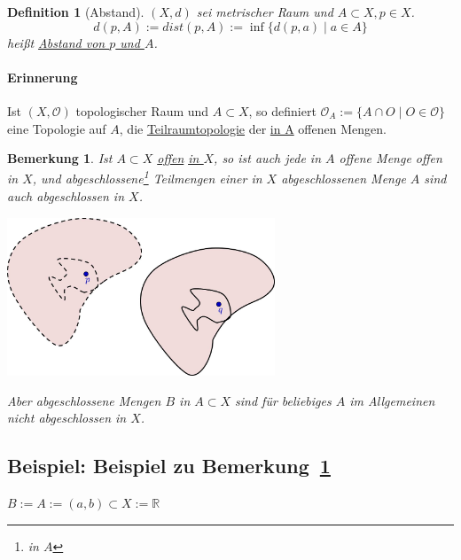 \documentclass[a4paper,11pt,notitlepage]{report}
\newtheorem{definition}{Definition}[chapter]
\newtheorem{remark}{Bemerkung}[chapter]
\newcommand{\R}{{\ensuremath{\mathbb{R}}}}
\newcommand{\OO}{{\ensuremath{\mathcal{O}}}}
\newenvironment{bsp}[1]
{
\setlength{\fboxsep}{10pt}
\subsection*{Beispiel: #1}
\begin{upshape}
}
{
\end{upshape}
}
\begin{document}
\begin{definition}[Abstand]
	$(X,d)$ sei metrischer Raum und $A \subset X, p \in X$.
	$$d(p,A) := dist(p,A):= \inf \{d(p,a) \mid a\in A \}$$
	heißt \underline{Abstand von $p$ und $A$}.
\end{definition}

\paragraph{Erinnerung}
Ist $(X, \OO)$ topologischer Raum und $A \subset X$, so definiert
$\OO_A := \{ A \cap O \mid O \in \OO \}$ eine Topologie auf $A$, die
 \underline{Teilraumtopologie} der \underline{in A} offenen Mengen.
 
\begin{remark}
	\label{offenAbgeschlossen}
	Ist $A \subset X$ \underline{offen} \underline{\underline{in $X$}}, so ist auch jede in $A$ offene Menge offen in $X$, und abgeschlossene\footnote{in $A$} Teilmengen einer in $X$ abgeschlossenen Menge $A$ sind auch abgeschlossen in $X$.
		
		\begin{center}
	\includegraphics[width=0.6\textwidth]{images/offen_abgeschlossen.jpg}
	\end{center}
	Aber abgeschlossene Mengen $B$ in $A \subset X$ sind für beliebiges $A$ im Allgemeinen nicht abgeschlossen in $X$.
\end{remark}

\begin{bsp}{Beispiel zu Bemerkung~\ref{offenAbgeschlossen}}
	$B := A := (a,b) \subset X := \R$
\end{bsp}
\end{document}
